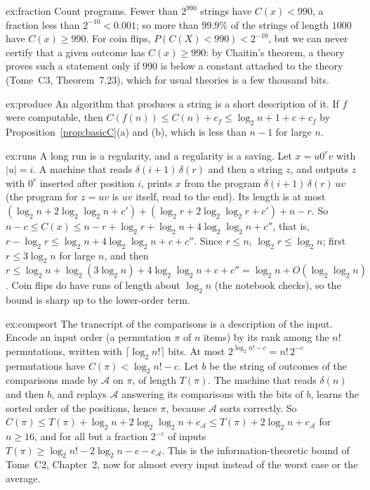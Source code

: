 \begin{solution}{ex:fraction}
\idea Count programs.
\writeup Fewer than $2^{990}$ strings have $C(x)<990$, a fraction less than $2^{-10}<0.001$; so more than $99.9\%$ of the strings of length $1000$ have $C(x)\ge990$. For coin flips, $P(C(X)<990)<2^{-10}$, but we can never certify that a given outcome has $C(x)\ge990$: by Chaitin's theorem, a theory proves such a statement only if $990$ is below a constant attached to the theory (Tome~C3, Theorem~7.23), which for usual theories is a few thousand bits.
\end{solution}

\begin{solution}{ex:produce}
\idea An algorithm that produces a string is a short description of it.
\writeup If $f$ were computable, then $C(f(n))\le C(n)+c_f\le\log_2n+1+c+c_f$ by Proposition~\ref{prop:basicC}(a) and (b), which is less than $n-1$ for large $n$.
\end{solution}

\begin{solution}{ex:runs}
\idea A long run is a regularity, and a regularity is a saving.
\writeup Let $x=u0^rv$ with $|u|=i$. A machine that reads $\delta(i+1)\,\delta(r)$ and then a string $z$, and outputs $z$ with $0^r$ inserted after position $i$, prints $x$ from the program $\delta(i+1)\,\delta(r)\,uv$ (the program for $z=uv$ is $uv$ itself, read to the end). Its length is at most $(\log_2n+2\log_2\log_2n+c')+(\log_2r+2\log_2\log_2r+c')+n-r$. So $n-c\le C(x)\le n-r+\log_2r+\log_2n+4\log_2\log_2n+c''$, that is, $r-\log_2r\le\log_2n+4\log_2\log_2n+c+c''$. Since $r\le n$, $\log_2r\le\log_2n$; first $r\le3\log_2n$ for large $n$, and then $r\le\log_2n+\log_2(3\log_2n)+4\log_2\log_2n+c+c''=\log_2n+O(\log_2\log_2n)$. Coin flips do have runs of length about $\log_2n$ (the notebook checks), so the bound is sharp up to the lower-order term.
\end{solution}

\begin{solution}{ex:compsort}
\idea The transcript of the comparisons is a description of the input.
\writeup Encode an input order (a permutation $\pi$ of $n$ items) by its rank among the $n!$ permutations, written with $\lceil\log_2n!\rceil$ bits. At most $2^{\log_2n!-c}=n!\,2^{-c}$ permutations have $C(\pi)<\log_2n!-c$. Let $b$ be the string of outcomes of the comparisons made by $\mathcal A$ on $\pi$, of length $T(\pi)$. The machine that reads $\delta(n)$ and then $b$, and replays $\mathcal A$ answering its comparisons with the bits of $b$, learns the sorted order of the positions, hence $\pi$, because $\mathcal A$ sorts correctly. So $C(\pi)\le T(\pi)+\log_2n+2\log_2\log_2n+c_{\mathcal A}\le T(\pi)+2\log_2n+c_{\mathcal A}$ for $n\ge16$, and for all but a fraction $2^{-c}$ of inputs $T(\pi)\ge\log_2n!-2\log_2n-c-c_{\mathcal A}$. This is the information-theoretic bound of Tome~C2, Chapter~2, now for almost every input instead of the worst case or the average.
\end{solution}

